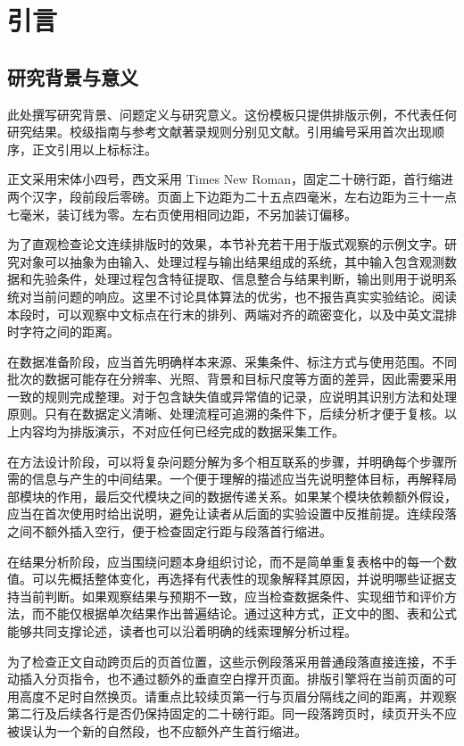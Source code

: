 \chapter{引言}
\section{研究背景与意义}
此处撰写研究背景、问题定义与研究意义。这份模板只提供排版示例，不代表任何研究结果。校级指南与参考文献著录规则分别见文献\cite{tongjiguide,gbstandard}。引用编号采用首次出现顺序，正文引用以上标标注。

正文采用宋体小四号，西文采用 Times New Roman，固定二十磅行距，首行缩进两个汉字，段前段后零磅。页面上下边距为二十五点四毫米，左右边距为三十一点七毫米，装订线为零。左右页使用相同边距，不另加装订偏移。

为了直观检查论文连续排版时的效果，本节补充若干用于版式观察的示例文字。研究对象可以抽象为由输入、处理过程与输出结果组成的系统，其中输入包含观测数据和先验条件，处理过程包含特征提取、信息整合与结果判断，输出则用于说明系统对当前问题的响应。这里不讨论具体算法的优劣，也不报告真实实验结论。阅读本段时，可以观察中文标点在行末的排列、两端对齐的疏密变化，以及中英文混排时字符之间的距离。

在数据准备阶段，应当首先明确样本来源、采集条件、标注方式与使用范围。不同批次的数据可能存在分辨率、光照、背景和目标尺度等方面的差异，因此需要采用一致的规则完成整理。对于包含缺失值或异常值的记录，应说明其识别方法和处理原则。只有在数据定义清晰、处理流程可追溯的条件下，后续分析才便于复核。以上内容均为排版演示，不对应任何已经完成的数据采集工作。

在方法设计阶段，可以将复杂问题分解为多个相互联系的步骤，并明确每个步骤所需的信息与产生的中间结果。一个便于理解的描述应当先说明整体目标，再解释局部模块的作用，最后交代模块之间的数据传递关系。如果某个模块依赖额外假设，应当在首次使用时给出说明，避免让读者从后面的实验设置中反推前提。连续段落之间不额外插入空行，便于检查固定行距与段落首行缩进。

在结果分析阶段，应当围绕问题本身组织讨论，而不是简单重复表格中的每一个数值。可以先概括整体变化，再选择有代表性的现象解释其原因，并说明哪些证据支持当前判断。如果观察结果与预期不一致，应当检查数据条件、实现细节和评价方法，而不能仅根据单次结果作出普遍结论。通过这种方式，正文中的图、表和公式能够共同支撑论述，读者也可以沿着明确的线索理解分析过程。

为了检查正文自动跨页后的页首位置，这些示例段落采用普通段落直接连接，不手动插入分页指令，也不通过额外的垂直空白撑开页面。排版引擎将在当前页面的可用高度不足时自然换页。请重点比较续页第一行与页眉分隔线之间的距离，并观察第二行及后续各行是否仍保持固定的二十磅行距。同一段落跨页时，续页开头不应被误认为一个新的自然段，也不应额外产生首行缩进。

